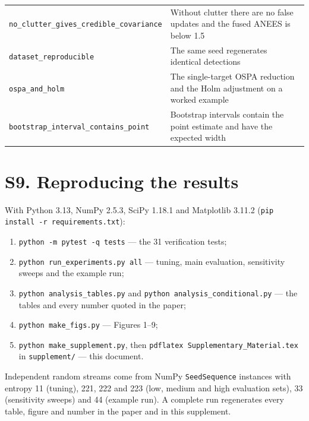 \documentclass[11pt,a4paper]{article}
\begin{document}
\begin{table}[!htbp]
\begin{tabular}{@{}>{\raggedright\arraybackslash}p{}>{\raggedright\arraybackslash}p{}@{}}
\nolinkurl{no_clutter_gives_credible_covariance} & Without clutter there are no false updates and the fused ANEES is below 1.5 \\
\nolinkurl{dataset_reproducible} & The same seed regenerates identical detections \\
\nolinkurl{ospa_and_holm} & The single-target OSPA reduction and the Holm adjustment on a worked example \\
\nolinkurl{bootstrap_interval_contains_point} & Bootstrap intervals contain the point estimate and have the expected width \\
\bottomrule
\end{tabular}
\end{table}

\FloatBarrier
\section*{S9. Reproducing the results}
\sloppy

With Python 3.13, NumPy 2.5.3, SciPy 1.18.1 and Matplotlib 3.11.2 (\texttt{pip install -r requirements.txt}):

\begin{enumerate}[leftmargin=*,itemsep=1pt]
\item \texttt{python -m pytest -q tests} --- the 31 verification tests;
\item \texttt{python run\_experiments.py all} --- tuning, main evaluation, sensitivity sweeps and the example run;
\item \texttt{python analysis\_tables.py} and \texttt{python analysis\_conditional.py} --- the tables and every number quoted in the paper;
\item \texttt{python make\_figs.py} --- Figures 1--9;
\item \texttt{python make\_supplement.py}, then \texttt{pdflatex Supplementary\_Material.tex} in \texttt{supplement/} --- this document.
\end{enumerate}

Independent random streams come from NumPy \texttt{SeedSequence} instances with entropy 11 (tuning), 221, 222 and 223 (low, medium and high evaluation sets), 33 (sensitivity sweeps) and 44 (example run). A complete run regenerates every table, figure and number in the paper and in this supplement.
\end{document}
